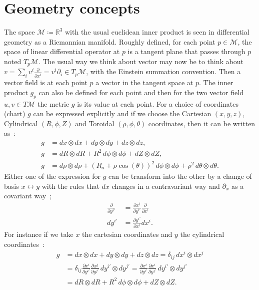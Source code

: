 \appendix

\cleardoublepage

\chapter{Geometry concepts}\label{sec:geom}

The space $\mathcal{M}\coloneqq\mathbb{R}^3$ with the usual euclidean inner product is seen in differential geometry as a Riemannian manifold. Roughly defined, for each point $p\in\mathcal{M}$, the space of linear differential operator at $p$ is a tangent plane that passes through $p$ noted $T_p\mathcal{M}$. The usual way we think about vector may now be to think about $v = \sum_iv^i\frac{\partial}{\partial x^i} = v^i\partial_i \in T_p\mathcal{M}$, with the Einstein summation convention. Then a vector field is at each point $p$ a vector in the tangent space at $p$. The inner product $g_p$ can also be defined for each point and then for the two vector field $u,v \in T\mathcal{M}$ the metric $g$ is its value at each point. For a choice of coordinates (chart) $g$ can be expressed explicitly and if we choose the Cartesian $(x,y,z)$, Cylindrical $(R,\phi,Z)$ and Toroidal $(\rho, \phi, \theta)$ coordinates, then it can be written as~:
\begin{align*}
    g &= dx\otimes dx + dy\otimes dy + dz\otimes dz,\\
    g &= dR\otimes dR + R^2\,d\phi\otimes d\phi + dZ\otimes dZ,\\
    g &= d\rho\otimes d\rho + (R_a+\rho\cos(\theta))^2\, d\phi\otimes d\phi + \rho^2\,d\theta\otimes d\theta.
\end{align*}
Either one of the expression for $g$ can be transform into the other by a change of basis $x \leftrightarrow y$ with the rules that $dx$ changes in a contravariant way and $\partial_x$ as a covariant way~;
\begin{align*}
    \frac{\partial}{\partial y^{i'}} &= \frac{\partial x^i}{\partial y^{i'}}\frac{\partial}{\partial x^i}\\
    dy^{i'} &= \frac{\partial y^{i'}}{\partial x^{i}}dx^i.
\end{align*}
For instance if we take $x$ the cartesian coordinates and $y$ the cylindrical coordinates~:
\begin{align*}
    g &= dx\otimes dx + dy\otimes dy + dz\otimes dz = \delta_{ij}\,dx^i\otimes dx^j\\
    &= \delta_{ij}\frac{\partial x^i}{\partial y^{i'}}\frac{\partial x^j}{\partial y^{j'}}\,dy^{i'}\otimes dy^{j'} = \frac{\partial x^i}{\partial y^{i'}}\frac{\partial x^i}{\partial y^{j'}}\,dy^{i'}\otimes dy^{j'}\\
    &= dR\otimes dR + R^2\,d\phi\otimes d\phi + dZ\otimes dZ.
\end{align*}
